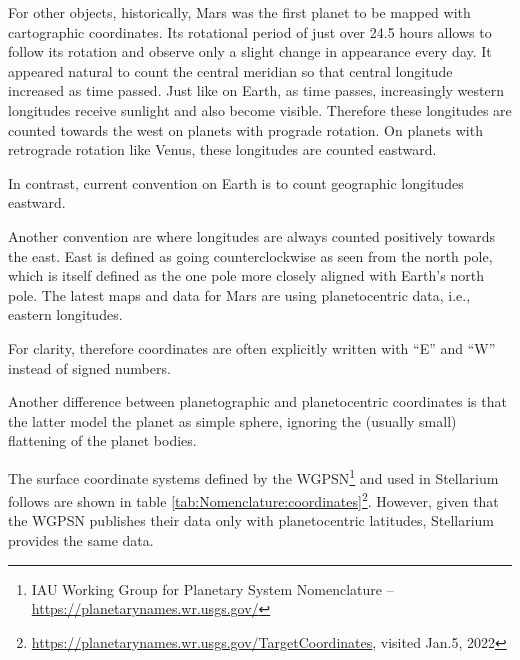 For other objects, historically, Mars was the first planet to be
mapped with cartographic coordinates. Its rotational period of just
over 24.5 hours allows to follow its rotation and observe only a
slight change in appearance every day. It appeared natural to count
the central meridian so that central longitude increased as time
passed. Just like on Earth, as time passes, increasingly western
longitudes receive sunlight and also become visible. Therefore these
 longitudes are
counted towards the west on planets with prograde rotation.  On
planets with retrograde rotation like Venus, these longitudes are
counted eastward.

In contrast, current convention on Earth is to count geographic
longitudes eastward.

Another convention are
where longitudes are always counted positively towards the east. East
is defined as going counterclockwise as seen from the north pole,
which is itself defined as the one pole more closely aligned with
Earth's north pole. The latest maps and data for Mars are using
planetocentric data, i.e., eastern longitudes.

For clarity, therefore coordinates are often explicitly written with ``E'' and
``W'' instead of signed numbers.


Another difference between planetographic and planetocentric
coordinates is that the latter model the planet as simple sphere,
ignoring the (usually small) flattening of the planet bodies.

The surface coordinate systems defined by the WGPSN\footnote{IAU
  Working Group for Planetary System Nomenclature --
  \url{https://planetarynames.wr.usgs.gov/}} and used in Stellarium
follows are shown in table
\ref{tab:Nomenclature:coordinates}\footnote{\url{https://planetarynames.wr.usgs.gov/TargetCoordinates},
  visited Jan.5, 2022}. However, given that the WGPSN publishes their
data only with planetocentric latitudes, Stellarium provides the same data.

